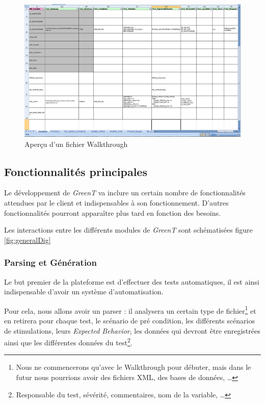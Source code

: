 		\begin{figure}[H]
			\centering
			\includegraphics[width=18.5cm]{contents/images/walkthrough.png}
			\caption{Aperçu d'un fichier Walkthrough}
		\end{figure}

	\subsection{Fonctionnalités principales}
	Le développement de \textit{GreenT} va inclure un certain nombre de fonctionnalités attendues par le client et indispensables à son fonctionnement. D'autres fonctionnalités pourront apparaître plus tard en fonction des besoins.

	Les interactions entre les différents modules de \textit{GreenT} sont schématisées figure \ref{fig:generalDig}

	\subsubsection{Parsing et Génération}\label{generation}
	Le but premier de la plateforme est d'effectuer des tests automatiques, il est ainsi indispensable d'avoir un système d'automatisation.

	Pour cela, nous allons avoir un parser : il analysera un certain type de fichier\footnote{Nous ne commencerons qu'avec le Walkthrough pour débuter, mais dans le futur nous pourrions avoir des fichiers XML, des bases de données, \ldots} et en retirera pour chaque test, le scénario de pré condition, les différents scénarios de stimulations, leurs \textit{Expected Behavior}, les données qui devront être enregistrées ainsi que les différentes données du test\footnote{Responsable du test, sévérité, commentaires, nom de la variable, \ldots}.

